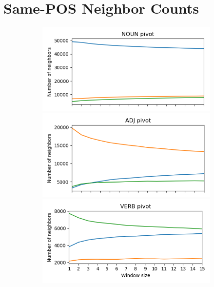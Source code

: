 \documentclass[11pt,a4paper]{article}
\begin{document}
    
    
    
\appendix
\section{Same-POS Neighbor Counts}\label{appendix:pos_hist}
    
    \begin{figure}[t]
        \begin{subfigure}[b]{\columnwidth}
        \includegraphics[width=\columnwidth]{figs/NOUN_nn_100_fasttext_enwiki-20170501-clean_cbow-300d-min500_pos.png}
        \includegraphics[width=\columnwidth]{figs/ADJ_nn_100_fasttext_enwiki-20170501-clean_cbow-300d-min500_pos.png}
        \includegraphics[width=\columnwidth]{figs/VERB_nn_100_fasttext_enwiki-20170501-clean_cbow-300d-min500_pos.png}

\end{subfigure}
\end{figure}
\end{document}
